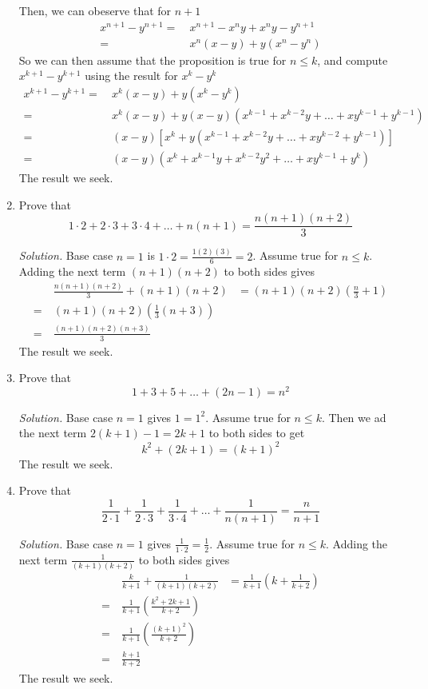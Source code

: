 \documentclass[12pt]{article}
\newcommand\sol[1]{\begin{mdframed}
\emph{Solution.} #1
\end{mdframed}}
\begin{document}
\begin{enumerate}
{      Then, we can obeserve that for $n+1$
      \begin{align*}
        x^{n+1} - y^{n+1} =\ & x^{n+1} - x^ny + x^ny - y^{n+1} \\
        =\ & x^n(x-y) + y(x^n-y^n)
      \end{align*}
      So we can then assume that the proposition is true for $n \le k$, and compute $x^{k+1}-y^{k+1}$ using the result for $x^k-y^k$
      \begin{align*}
       x^{k+1} - y^{k+1} =\ & x^k(x-y) + y(x^k-y^k) \\
        =\ & x^k(x-y) + y(x-y)(x^{k-1}+x^{k-2}y +\ldots+xy^{k-1} + y^{k-1}) \\
        =\ & (x-y) [x^k + y(x^{k-1}+x^{k-2}y +\ldots+xy^{k-2} + y^{k-1})] \\
        =\ & (x-y) (x^k + x^{k-1}y+x^{k-2}y^2 +\ldots+xy^{k-1} + y^{k}) 
      \end{align*}
      The result we seek.
    }

  \item Prove that
    \[
    1\cdot2 + 2\cdot3 + 3\cdot4 + \ldots+n(n+1) = \frac{n(n+1)(n+2)}{3}
    \]
    \sol{Base case $n=1$ is $1\cdot2 = \frac{1(2)(3)}{6} = 2$. Assume true for $n \le k$. Adding the next term $(n+1)(n+2)$ to both sides gives
      \begin{align*}
        & \frac{n(n+1)(n+2)}{3} + (n+1)(n+2) &= (n+1)(n+2)\left(\frac{n}{3} + 1\right) \\
        =\ & (n+1)(n+2) \left(\frac{1}{3} (n+3)\right) \\
        =\ & \frac{(n+1)(n+2)(n+3)}{3}
      \end{align*}
      The result we seek.}

  \item Prove that
    \[
    1+3+5+\ldots+(2n-1) = n^2
    \]
    \sol{Base case $n=1$ gives $1 = 1^2$. Assume true for $n \le k$. Then we ad the next term $2(k+1)-1 = 2k+1$ to both sides to get
      \[
      k^2 + (2k+1) = (k+1)^2
      \]
      The result we seek.
    }

  \item Prove that
    \[
    \frac{1}{2\cdot1} + \frac{1}{2\cdot3} + \frac{1}{3\cdot4} +\ldots+\frac{1}{n(n+1)} = \frac{n}{n+1}    
    \]
    \sol{Base case $n=1$ gives $\frac{1}{1\cdot 2} = \frac{1}{2}$. Assume true for $n \le k$. Adding the next term $\frac{1}{(k+1)(k+2)}$ to both sides gives
        \begin{align*}
          & \frac{k}{k+1} + \frac{1}{(k+1)(k+2)} &= \frac{1}{k+1} \left ( k + \frac{1}{k+2} \right) \\
          =\ & \frac{1}{k+1} \left ( \frac{k^2 + 2k + 1}{k+2} \right) \\
          =\ & \frac{1}{k+1} \left ( \frac{(k+ 1)^2}{k+2} \right) \\
          =\ & \frac{k+ 1}{k+2}
        \end{align*}
        The result we seek.
    }


\end{enumerate}
\end{document}

